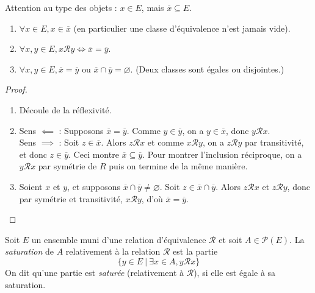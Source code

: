 Attention au type des objets : $x \in E$, mais $\overline{x} \subseteq E$.

\begin{proposition}
\begin{enumerate}
\item $\forall x\in E, x\in \overline{x}$ (en particulier une classe d'équivalence n'est jamais vide).
\item $\forall x, y\in E, x{\mathcal R}y \iff \overline{x}=\overline{y}$.
\item $\forall x, y\in E, \overline{x} = \overline{y} \text{ ou } \overline{x}\cap \overline{y}=\varnothing$. (Deux classes sont égales ou disjointes.)
\end{enumerate}
\end{proposition}
\begin{proof}
\begin{enumerate}
\item Découle de la réflexivité.
\item Sens $\impliedby$ : Supposons $\overline{x}=\overline{y}$. Comme $y\in \overline{y}$, on a $y\in \overline{x}$, donc $y{\mathcal R}x$.\\
Sens $\implies$ : Soit $z\in \overline{x}$. Alors $z{\mathcal R}x$ et comme $x{\mathcal R}y$, on a $z{\mathcal R}y$ par transitivité, et donc $z\in \overline{y}$. Ceci montre $\overline{x}\subseteq \overline{y}$. Pour montrer l'inclusion réciproque, on a $y{\mathcal R}x$ par symétrie de $R$ puis on termine de la même manière.
\item Soient $x$ et $y$, et supposons $\overline{x}\cap \overline{y} \neq \varnothing$. Soit $z\in \overline{x}\cap \overline{y}$. Alors $z\mathcal R x$ et $z\mathcal R y$, donc par symétrie et transitivité, $x\mathcal R y$, d'où $\overline{x}=\overline{y}$.
\end{enumerate}
\end{proof}

\begin{definition}
Soit $E$ un ensemble muni d'une relation d'équivalence ${\mathcal R}$ et soit $A\in \mathcal P(E)$. La \emph{saturation} de $A$ relativement à la relation $\mathcal R$ est la partie
\[
\{y\in E\:|\: \exists x\in A, y\mathcal R x\} 
\]
On dit qu'une partie est \emph{saturée} (relativement à $\mathcal R$), si elle est égale à sa saturation.
\end{definition}

